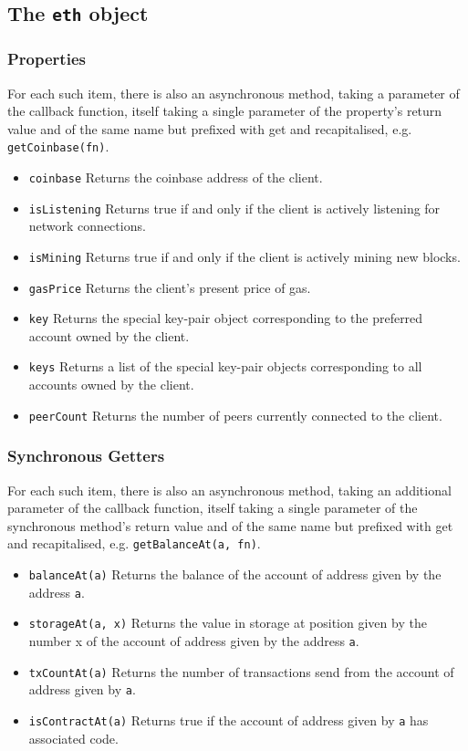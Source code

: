 \documentclass[9pt,oneside]{amsart}
\begin{document}
\subsection{The \texttt{eth} object}

\subsubsection{Properties}

For each such item, there is also an asynchronous method, taking a parameter of the callback function, itself taking a single parameter of the property's return value and of the same name but prefixed with get and recapitalised, e.g. \texttt{getCoinbase(fn)}.

\begin{itemize}
\item \texttt{coinbase} Returns the coinbase address of the client.
\item \texttt{isListening} Returns true if and only if the client is actively listening for network connections.
\item \texttt{isMining} Returns true if and only if the client is actively mining new blocks.
\item \texttt{gasPrice} Returns the client's present price of gas.
\item \texttt{key} Returns the special key-pair object corresponding to the preferred account owned by the client.
\item \texttt{keys} Returns a list of the special key-pair objects corresponding to all accounts owned by the client.
\item \texttt{peerCount} Returns the number of peers currently connected to the client.
\end{itemize}

\subsubsection{Synchronous Getters}
For each such item, there is also an asynchronous method, taking an additional parameter of the callback function, itself taking a single parameter of the synchronous method's return value and of the same name but prefixed with get and recapitalised, e.g. \texttt{getBalanceAt(a, fn)}.

\begin{itemize}
\item \texttt{balanceAt(a)} Returns the balance of the account of address given by the address \texttt{a}.
\item \texttt{storageAt(a, x)} Returns the value in storage at position given by the number x of the account of address given by the address \texttt{a}.
\item \texttt{txCountAt(a)} Returns the number of transactions send from the account of address given by \texttt{a}.
\item \texttt{isContractAt(a)} Returns true if the account of address given by \texttt{a} has associated code.
\end{itemize}
\end{document}
